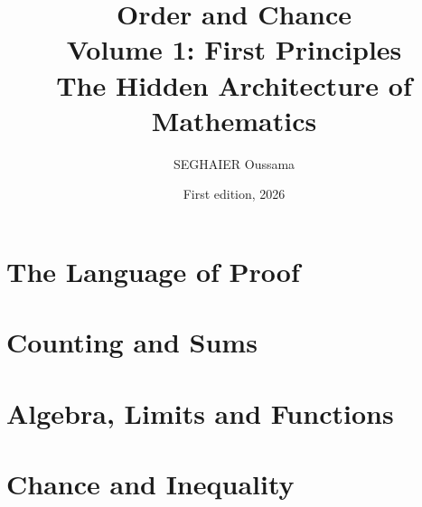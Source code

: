 \documentclass[11pt,openany]{book}
\title{\Huge\textbf{Order and Chance}\\[0.4em]\LARGE Volume 1: First Principles\\[0.6em]
\Large The Hidden Architecture of Mathematics}
\author{SEGHAIER Oussama}
\date{First edition, 2026}
\theoremstyle{plain}
\begin{document}
\frontmatter
\makecover
\maketitle

\tableofcontents

\mainmatter
\setcounter{chapter}{-1}
\part{The Language of Proof}


\part{Counting and Sums}


\part{Algebra, Limits and Functions}






\part{Chance and Inequality}



\backmatter




\end{document}
